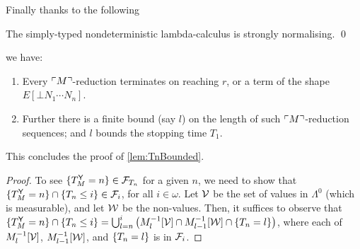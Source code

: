 Finally thanks to the following
\begin{theorem}
\label{thm:de groote}
The simply-typed nondeterministic lambda-calculus is strongly normalising. \qed
\end{theorem}
we have:

\begin{enumerate}
\item Every ${\ulcorner{M}\urcorner}$-reduction terminates on reaching $r$, or a term of the shape $E[\bot N_1 \cdots N_n]$.

\item Further there is a finite bound (say $l$) on the length of such ${\ulcorner{M}\urcorner}$-reduction sequences; and $l$ bounds the stopping time $T_1$.
\end{enumerate}
This concludes the proof of \cref{lem:TnBounded}.

\iffalse
@inproceedings{DBLP:conf/lfcs/Groote94,
  author    = {Philippe de Groote},
  editor    = {Anil Nerode and
               Yuri V. Matiyasevich},
  title     = {Strong Normalization in a Non-Deterministic Typed Lambda-Calculus},
  booktitle = {Logical Foundations of Computer Science, Third International Symposium,
               LFCS'94, St. Petersburg, Russia, July 11-14, 1994, Proceedings},
  series    = {Lecture Notes in Computer Science},
  volume    = {813},
  pages     = {142--152},
  publisher = {Springer},
  year      = {1994},
  url       = {https://doi.org/10.1007/3-540-58140-5\_15},
  doi       = {10.1007/3-540-58140-5\_15},
  timestamp = {Tue, 14 May 2019 10:00:54 +0200},
  biburl    = {https://dblp.org/rec/conf/lfcs/Groote94.bib},
  bibsource = {dblp computer science bibliography, https://dblp.org}
}
\fi

\medskip

\TMtYStoppingTime*
\begin{proof}
To see $\{{T_M^{\mathsf{Y}} = n}\} \in \mathcal{F}_{T_n}$ for a given $n$, we need to show that $\{{T_M^{\mathsf{Y}} = n}\} \cap \{{T_n \leq i}\} \in \mathcal{F}_i$, for all $i \in \omega$.
Let $\cal V$ be the set of values in $\Lambda^0$ (which is measurable), and let $\cal W$ be the non-values.
Then, it suffices to observe that $\set{T_M^\tY = n} \cap \set{T_n \leq i}
= \bigcup_{l=n}^i 
\big( M_l^{-1} [{\cal V}] \cap  
M_{l-1}^{-1} [{\cal W}] \cap 
\set{T_n = l} \big)
$, where each of $M_l^{-1} [{\cal V}]$, $M_{l-1}^{-1} [{\cal W}]$, and $\{{T_n = l}\}$ is in $\mathcal{F}_i$.
\end{proof}



